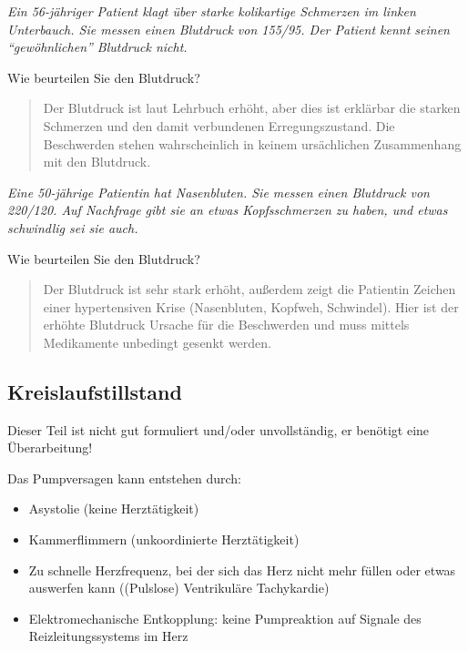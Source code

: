 \emph{Ein 56-jähriger Patient klagt über starke
kolikartige Schmerzen im linken Unterbauch. Sie messen einen Blutdruck von 155/95. Der Patient
kennt seinen "`gewöhnlichen"' Blutdruck
nicht.}  

Wie beurteilen Sie den Blutdruck? 

\begin{quote}
Der Blutdruck ist laut Lehrbuch erhöht, aber dies ist erklärbar die
starken Schmerzen und den damit verbundenen Erregungszustand. Die
Beschwerden stehen wahrscheinlich in keinem ursächlichen Zusammenhang
mit den Blutdruck. 
\end{quote}

\emph{Eine 50-jährige Patientin hat Nasenbluten. Sie
messen einen Blutdruck von 220/120. Auf Nachfrage gibt sie an etwas Kopfsschmerzen zu haben,
und etwas schwindlig sei sie auch.} 

Wie beurteilen Sie den Blutdruck? 

\begin{quote}
Der Blutdruck ist sehr stark erhöht, außerdem zeigt die
Patientin Zeichen einer hypertensiven Krise (Nasenbluten, Kopfweh, Schwindel).
Hier ist der erhöhte Blutdruck Ursache für die Beschwerden und muss
mittels Medikamente unbedingt gesenkt werden. 
\end{quote}


\subsection{Kreislaufstillstand}\label{bkm:RefHeading42514602}\label{topic:kreislaufstillstand}


   {Dieser Teil ist nicht gut formuliert und/oder unvollständig, 
   er benötigt eine Überarbeitung!
}

Das Pumpversagen kann entstehen durch:

\begin{itemize}
    \item Asystolie (keine Herztätigkeit)
    \item Kammerflimmern (unkoordinierte Herztätigkeit)
    \item Zu schnelle Herzfrequenz, bei der sich das Herz
    nicht mehr füllen oder etwas auswerfen kann ((Pulslose) Ventrikuläre Tachykardie)
    \item Elektromechanische Entkopplung: keine
    Pumpreaktion auf Signale des Reizleitungssystems im Herz
\end{itemize}

